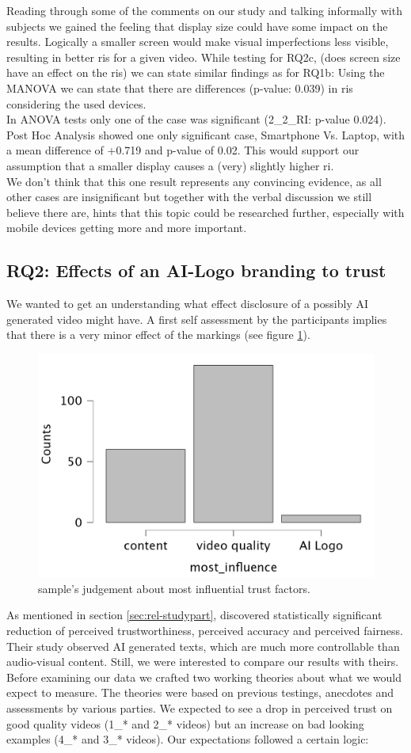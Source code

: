 \documentclass[
  a4paper,  %
  twoside,  %
  bibliography=totoc,
  headsepline,
  cleardoublepage=empty,
  parskip=half,
  draft=false
]{scrbook}
\begin{document}
Reading through some of the comments on our study and talking informally with subjects we gained the feeling that display size could have some impact on the results. Logically a smaller screen would make visual imperfections less visible, resulting in better \gls{ri}s for a given video. While testing for RQ2c, (does screen size have an effect on the \gls{ri}s) we can state similar findings as for RQ1b: Using the MANOVA we can state that there are differences (p-value: 0.039) in \gls{ri}s considering the used devices. \\
In ANOVA tests only one of the case was significant (2\_2\_RI: p-value 0.024). Post Hoc Analysis showed one only significant case, Smartphone Vs. Laptop, with a mean difference of +0.719 and p-value of 0.02. This would support our assumption that a smaller display causes a (very) slightly higher \gls{ri}. \\
We don't think that this one result represents any convincing evidence, as all other cases are insignificant but together with the verbal discussion we still believe there are, hints that this topic could be researched further, especially with mobile devices getting more and more important.


\subsection{RQ2: Effects of an AI-Logo branding to trust}
\label{subsec:RQ2}
We wanted to get an understanding what effect disclosure of a possibly AI generated video might have. A first self assessment by the participants implies that there is a very minor effect of the markings (see figure \ref{fig:most-influence}).
\begin{figure}[h]
  \centering
  \includegraphics[width=.5\textwidth]{graphics/images/statistics/most-influence.png}
  \caption{sample's judgement about most influential trust factors.}
  \label{fig:most-influence}
\end{figure}
As mentioned in section \ref{sec:rel-studypart},  discovered statistically significant reduction of perceived trustworthiness, perceived accuracy and perceived fairness. Their study observed AI generated texts, which are much more controllable than audio-visual content. Still, we were interested to compare our results with theirs. \\
Before examining our data we crafted two working theories about what we would expect to measure. The theories were based on previous testings, anecdotes and assessments by various parties. We expected to see a drop in perceived trust on good quality videos (1\_* and 2\_* videos) but an increase on bad looking examples (4\_* and 3\_* videos). Our expectations followed a certain logic:
\end{document}
